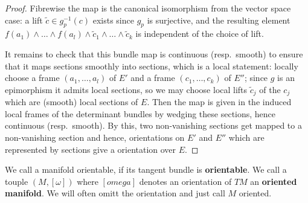 \begin{proof}
	Fibrewise the map is the canonical isomorphism from the vector
    space case: a lift $\tilde c\in g_p^{-1}(c)$ exists since $g_p$ is
    surjective, and the resulting element
    $f(a_1)\wedge\dots\wedge f(a_l)\wedge\tilde c_1\wedge\dots\wedge
    \tilde c_k$ is independent of the choice of lift.

	 It remains to
    check that this bundle map is continuous (resp.\ smooth) to ensure that it maps sections smoothly into sections, which is
    a local statement: locally choose a frame $(a_1,\dots,a_l)$ of $E'$
    and a frame $(c_1,\dots,c_k)$ of $E''$; since $g$ is an epimorphism
    it admits local sections, so we may choose local lifts
    $\tilde c_j$ of the $c_j$ which are (smooth) local sections of $E$.
    Then the map is given in the induced local frames of the
    determinant bundles by wedging these sections, hence continuous
    (resp.\ smooth). By this, two non-vanishing sections get mapped to a non-vanishing section and hence, orientations on $E'$ and $E''$ which are represented by sections give a orientation over $E$. 
\end{proof}
\begin{definition}
	We call a manifold orientable, if its tangent bundle is \textbf{orientable}. We call a touple $(M,[\omega])$ where $[omega]$ denotes an orientation of $TM$ an \textbf{oriented manifold}. We will often omitt the orientation and just call $M$ oriented.
\end{definition}

